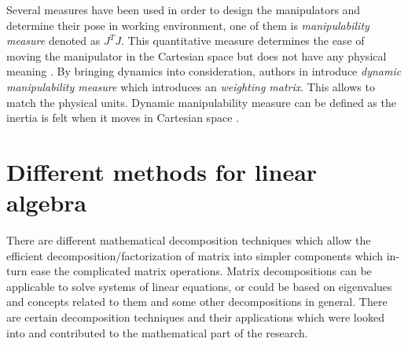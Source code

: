 \par
Several measures have been used in order to design the manipulators and determine their pose in working environment, one of them is \textit{manipulability measure} denoted as $J^{T}J$. This quantitative measure determines the ease of moving the manipulator in the Cartesian space but does not have any physical meaning \cite{bryunixonline} \cite{yoshikawa1985dynamic}. By bringing dynamics into consideration, authors in \cite{yoshikawa1985dynamic} introduce \textit{dynamic manipulability measure} which introduces an \textit{weighting matrix}. This allows to match the physical units. Dynamic manipulability measure can be defined as the inertia is felt when it moves in Cartesian space \cite{bryunixonline}. 

\section{Different methods for linear algebra}
\label{algebra}
There are different mathematical decomposition techniques which allow the efficient decomposition/factorization of matrix into simpler components which in-turn ease the complicated matrix operations. Matrix decompositions can be applicable to solve systems of linear equations, or could be based on eigenvalues and concepts related to them and some other decompositions in general. There are certain decomposition techniques and their applications which were looked into and contributed to the mathematical part of the research. 
